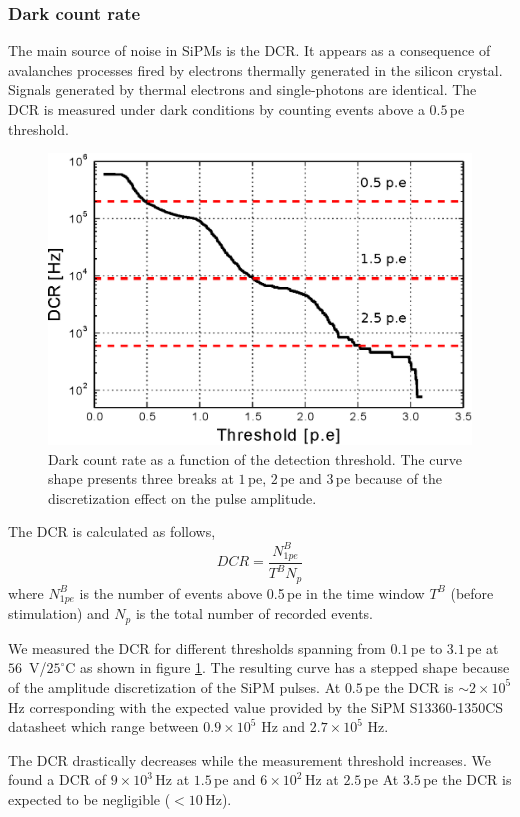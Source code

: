 \documentclass[a4paper,11pt]{article}
\begin{document}
\subsubsection{Dark count rate}
The main source of noise in SiPMs is the DCR. It appears as a consequence of avalanches processes fired by electrons thermally generated in the silicon crystal. Signals generated by thermal electrons and single-photons are identical. The DCR is measured under dark conditions by counting events above a $0.5$\,pe threshold.

\begin{figure}[htbp]
\centering %
\includegraphics[width=.55\textwidth]{Figures/DCR_vs_th_pe_1350CS.eps}
\caption{\label{fig:DCR} Dark count rate as a function of the detection threshold. The curve shape presents three breaks at $1$\,pe, $2$\,pe and $3$\,pe because of the discretization effect on the pulse amplitude.}
\end{figure}

The DCR is calculated as follows,
\begin{equation}
    DCR = \frac{N_{1pe}^B}{T^B N_p}
\label{eq:DCR}
\end{equation}
where $N_{1pe}^B$ is the number of events above 0.5\,pe in the time window $T^B$ (before stimulation) and $N_p$ is the total number of recorded events.

We measured the DCR for different thresholds spanning from $0.1$\,pe to $3.1$\,pe at $56$\, V/$25^{\circ}$C as shown in figure \ref{fig:DCR}. The resulting curve has a stepped shape because of the amplitude discretization of the SiPM pulses. At $0.5$\,pe the DCR is $\sim2\times 10^5$ Hz corresponding with the expected value provided by the SiPM S13360-1350CS datasheet which range between $0.9\times 10^5$ Hz and $2.7\times 10^5$ Hz.

The DCR drastically decreases while the measurement threshold increases. We found a DCR of $9\times 10^3$\,Hz at $1.5$\,pe and $6\times 10^2$\,Hz at $2.5$\,pe At $3.5$\,pe the DCR is expected to be negligible ($< 10$\,Hz).
\end{document}
